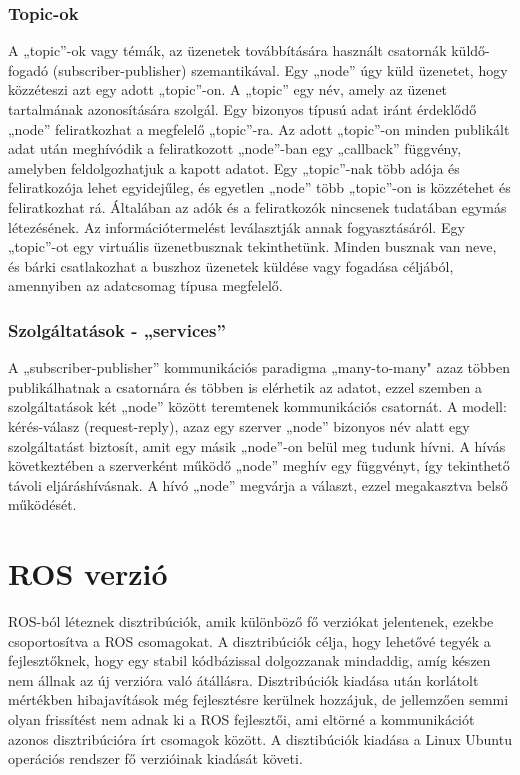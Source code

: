 \subsubsection{Topic-ok}
A „topic”-ok vagy témák, az üzenetek továbbítására használt csatornák küldő-fogadó (subscriber-publisher) szemantikával. Egy „node” úgy küld üzenetet, hogy közzéteszi azt egy adott „topic”-on. A „topic” egy név, amely az üzenet tartalmának azonosítására szolgál. Egy bizonyos típusú adat iránt érdeklődő „node” feliratkozhat a megfelelő „topic”-ra. Az adott „topic”-on minden publikált adat után meghívódik a feliratkozott „node”-ban egy „callback” függvény, amelyben feldolgozhatjuk a kapott adatot. Egy „topic”-nak több adója és feliratkozója lehet egyidejűleg, és egyetlen „node” több „topic”-on is közzétehet és feliratkozhat rá. Általában az adók és a feliratkozók nincsenek tudatában egymás létezésének. Az információtermelést leválasztják annak fogyasztásáról. Egy „topic”-ot egy virtuális üzenetbusznak tekinthetünk. Minden busznak van neve, és bárki csatlakozhat a buszhoz üzenetek küldése vagy fogadása céljából, amennyiben az adatcsomag típusa megfelelő.

\subsubsection{Szolgáltatások - „services”}
A „subscriber-publisher” kommunikációs paradigma „many-to-many" azaz többen publikálhatnak a csatornára és többen is elérhetik az adatot, ezzel szemben a szolgáltatások két „node” között teremtenek kommunikációs csatornát. A modell: kérés-válasz (request-reply), azaz egy szerver „node” bizonyos név alatt egy szolgáltatást biztosít, amit egy másik „node”-on belül meg tudunk hívni. A hívás következtében a szerverként működő „node” meghív egy függvényt, így tekinthető távoli eljáráshívásnak. A hívó „node” megvárja a választ, ezzel megakasztva belső működését.

\section{ROS verzió}
ROS-ból léteznek disztribúciók, amik különböző fő verziókat jelentenek, ezekbe csoportosítva a ROS csomagokat. A disztribúciók célja, hogy lehetővé tegyék a fejlesztőknek, hogy egy stabil kódbázissal dolgozzanak mindaddig, amíg készen nem állnak az új verzióra való átállásra. Disztribúciók kiadása után korlátolt mértékben hibajavítások még fejlesztésre kerülnek hozzájuk, de jellemzően semmi olyan frissítést nem adnak ki a ROS fejlesztői, ami eltörné a kommunikációt azonos disztribúcióra írt csomagok között. A disztibúciók kiadása a Linux Ubuntu operációs rendszer fő verzióinak kiadását követi.

